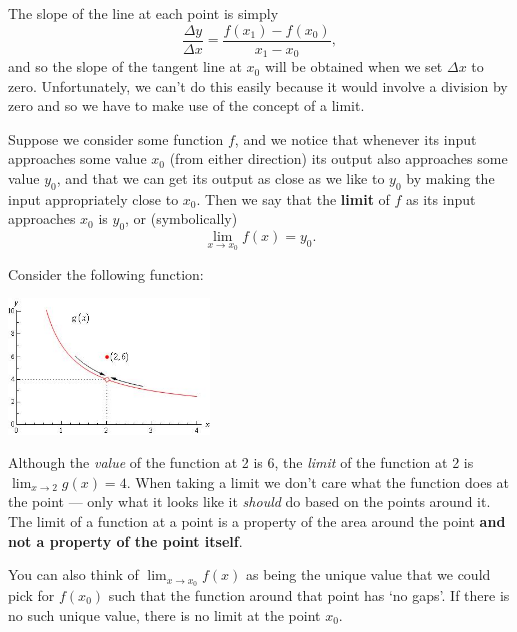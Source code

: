 The slope of the line at each point is simply
\begin{displaymath}
  \frac{\Delta y}{\Delta x} = \frac{f(x_1) - f(x_0)}{x_1 - x_0},
\end{displaymath}
and so the slope of the tangent line at $ x_0 $ will be obtained when we set $ \Delta x $ to zero. Unfortunately, we can't
do this easily because it would involve a division by zero and so we have to make use of the concept of a limit.

Suppose we consider some function $ f $, and we notice that whenever its input approaches some value $ x_0 $ (from either direction) its
output also approaches some value $ y_0 $, and that we can get its output as close as we like to $ y_0 $ by making the input appropriately
close to $ x_0 $. Then we say that the \textbf{limit} of $ f $ as its input approaches $ x_0 $ is $ y_0 $, or (symbolically)
\begin{displaymath}
  \lim_{x \to x_0} f(x) = y_0.
\end{displaymath}

Consider the following function:
\begin{center}
  \includegraphics[width=0.4\textwidth]{oslimit2}
\end{center}
Although the \textit{value} of the function at 2 is 6, the \textit{limit} of the function at 2 is $ \lim_{x \to 2} g(x) = 4 $. When taking a limit we
don't care what the function does at the point --- only what it looks like it \emph{should} do based on the points around it. The limit of a function
at a point is a property of the area around the point \textbf{and not a property of the point itself}.

You can also think of $ \lim_{x \to x_0} f(x) $ as being the unique value that we could pick for $ f(x_0) $ such that the function
around that point has `no gaps'. If there is no such unique value, there is no limit at the point $ x_0 $.

